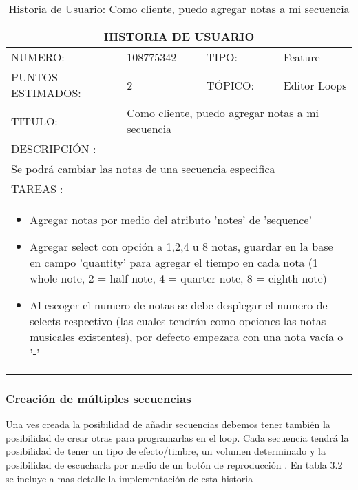 \begin{table}[h]
\centering
\renewcommand{\arraystretch}{1.4}
\begin{tabular}{|*{4}{l|}}
\hline
\multicolumn{4}{|c|}{HISTORIA DE USUARIO} \\ \hline
NUMERO: & 108775342 & TIPO: & Feature \\ \hline
PUNTOS ESTIMADOS: & 2 & TÓPICO: & Editor Loops \\ \hline
TITULO: & \multicolumn{3}{|p{7.2cm}|}{Como cliente, puedo agregar notas a mi secuencia} \\ \hline
\multicolumn{4}{|l|}{DESCRIPCIÓN : } \\ \hline
\multicolumn{4}{|l|}{Se podrá cambiar las notas de una secuencia especifica} \\ \hline
\multicolumn{4}{|l|}{TAREAS : } \\ \hline
\multicolumn{4}{|p{11cm}|}{
\begin{minipage}[t]{\hsize}
  \begin{itemize}
    \item Agregar notas por medio del atributo 'notes' de 'sequence'
    \item Agregar select con opción a 1,2,4 u 8 notas, guardar en la base en campo 'quantity' para agregar el tiempo en cada nota (1 = whole note, 2 = half note, 4 = quarter note, 8 = eighth note)
    \item Al escoger el numero de notas se debe desplegar el numero de selects respectivo (las cuales tendrán como opciones las notas musicales existentes), por defecto empezara con una nota vacía o '-'
  \end{itemize}
\end{minipage}
} \\ \hline
\end{tabular}
\caption{Historia de Usuario: Como cliente, puedo agregar notas a mi secuencia}
\label{tab:Primero}
\end{table}

\subsubsection{Creación de múltiples secuencias}

Una ves creada la posibilidad de añadir secuencias debemos tener también la posibilidad
de crear otras para programarlas en el loop. Cada secuencia tendrá la posibilidad
de tener un tipo de efecto/timbre, un volumen determinado y la posibilidad de
escucharla por medio de un botón de reproducción
. En tabla 3.2 se incluye a mas detalle la implementación de
esta historia

